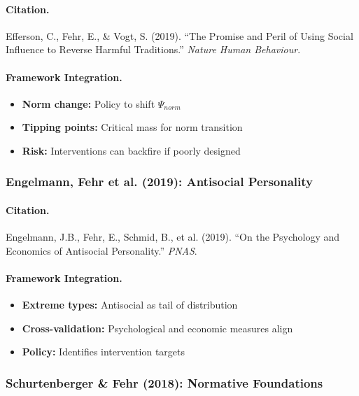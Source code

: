 \paragraph{Citation.}
Efferson, C., Fehr, E., \& Vogt, S. (2019).
``The Promise and Peril of Using Social Influence to Reverse Harmful Traditions.''
\emph{Nature Human Behaviour}.

\paragraph{Framework Integration.}
\begin{itemize}
  \item \textbf{Norm change:} Policy to shift $\Psi_{norm}$
  \item \textbf{Tipping points:} Critical mass for norm transition
  \item \textbf{Risk:} Interventions can backfire if poorly designed
\end{itemize}

\subsubsection{Engelmann, Fehr et al. (2019): Antisocial Personality}

\paragraph{Citation.}
Engelmann, J.B., Fehr, E., Schmid, B., et al. (2019).
``On the Psychology and Economics of Antisocial Personality.''
\emph{PNAS}.

\paragraph{Framework Integration.}
\begin{itemize}
  \item \textbf{Extreme types:} Antisocial as tail of distribution
  \item \textbf{Cross-validation:} Psychological and economic measures align
  \item \textbf{Policy:} Identifies intervention targets
\end{itemize}

\subsubsection{Schurtenberger \& Fehr (2018): Normative Foundations}

